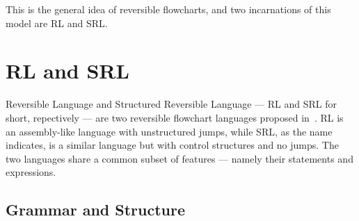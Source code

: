
\noindent This is the general idea of reversible flowcharts, and two incarnations of this model are RL and SRL.\



\section*{RL and SRL}
\noindent Reversible Language and Structured Reversible Language --- RL and SRL for short, repectively --- are two reversible flowchart languages proposed in~\cite{REV}. RL is an assembly-like language with unstructured jumps, while SRL, as the name indicates, is a similar language but with control structures and no jumps. The two languages share a common subset of features --- namely their statements and expressions.

\subsection*{Grammar and Structure}

